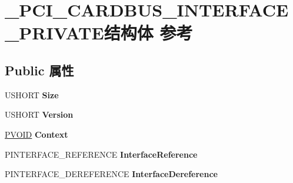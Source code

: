 \hypertarget{struct___p_c_i___c_a_r_d_b_u_s___i_n_t_e_r_f_a_c_e___p_r_i_v_a_t_e}{}\section{\+\_\+\+P\+C\+I\+\_\+\+C\+A\+R\+D\+B\+U\+S\+\_\+\+I\+N\+T\+E\+R\+F\+A\+C\+E\+\_\+\+P\+R\+I\+V\+A\+T\+E结构体 参考}
\label{struct___p_c_i___c_a_r_d_b_u_s___i_n_t_e_r_f_a_c_e___p_r_i_v_a_t_e}
\subsection*{Public 属性}
\begin{DoxyCompactItemize}
\item 
\mbox{\label{struct___p_c_i___c_a_r_d_b_u_s___i_n_t_e_r_f_a_c_e___p_r_i_v_a_t_e_a7fc83e70369e4d78c2eb7868fd34d4bc}} 
U\+S\+H\+O\+RT {\bfseries Size}
\item 
\mbox{\label{struct___p_c_i___c_a_r_d_b_u_s___i_n_t_e_r_f_a_c_e___p_r_i_v_a_t_e_a0e5ca5713ee2a2fe02ddcde8b6bd3e57}} 
U\+S\+H\+O\+RT {\bfseries Version}
\item 
\mbox{\label{struct___p_c_i___c_a_r_d_b_u_s___i_n_t_e_r_f_a_c_e___p_r_i_v_a_t_e_a194c11c283df5dee7227fd6208ef7456}} 
\hyperlink{interfacevoid}{P\+V\+O\+ID} {\bfseries Context}
\item 
\mbox{\label{struct___p_c_i___c_a_r_d_b_u_s___i_n_t_e_r_f_a_c_e___p_r_i_v_a_t_e_aba7d630a45a83243a2dc774fad06dd11}} 
P\+I\+N\+T\+E\+R\+F\+A\+C\+E\+\_\+\+R\+E\+F\+E\+R\+E\+N\+CE {\bfseries Interface\+Reference}
\item 
\mbox{\label{struct___p_c_i___c_a_r_d_b_u_s___i_n_t_e_r_f_a_c_e___p_r_i_v_a_t_e_af2fd1daed579ae1de244e1791b268539}} 
P\+I\+N\+T\+E\+R\+F\+A\+C\+E\+\_\+\+D\+E\+R\+E\+F\+E\+R\+E\+N\+CE {\bfseries Interface\+Dereference}

\end{DoxyCompactItemize}
